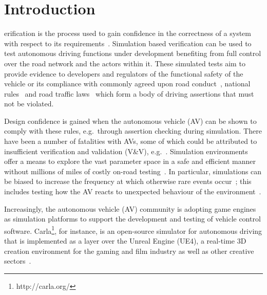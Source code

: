 \documentclass[letterpaper, 10 pt, journal, twoside]{IEEEtran}
\begin{document}
\section{Introduction} \label{s:introduction}
erification is the process used to gain confidence in the correctness of a system with respect to its requirements~\cite{bergeron2012writing}. Simulation based verification can be used to test autonomous driving functions under development benefiting from full control over the road network and the actors within it. These simulated tests aim to provide evidence to developers and regulators of the functional safety of the vehicle or its compliance with commonly agreed upon road conduct~\cite{ViennaConv}, national rules~\cite{codes2015highway} and road traffic laws~\cite{RoadTraffic1988} which form a body of driving assertions that must not be violated. 

Design confidence is gained when the autonomous vehicle (AV) can be shown to comply with these rules, e.g.\ through assertion checking during simulation. 
There have been a number of fatalities with AVs, some of which could be attributed to insufficient verification and validation (V\&V), e.g.~\cite{FatalityExample}. Simulation environments offer a means to explore the vast parameter space in a safe and efficient manner~\cite{korosec2019waymo} without millions of miles of costly on-road testing~\cite{kalra2016driving}. In particular, simulations can be biased to increase the frequency at which otherwise rare events occur~\cite{Koopman2018}; this includes testing how the AV reacts to unexpected behaviour of the environment~\cite{RobustnessAutonomy}. 

Increasingly, the autonomous vehicle (AV) community is adopting game engines as simulation platforms to support the development and testing of vehicle control software. 
%
Carla\footnote{http://carla.org/}, for instance, is an open-source simulator for autonomous driving that is implemented as a layer over the Unreal Engine (UE4), a  real-time 3D creation environment for the gaming and film industry as well as other creative sectors~\cite{CARLA_paper}. 
\end{document}

